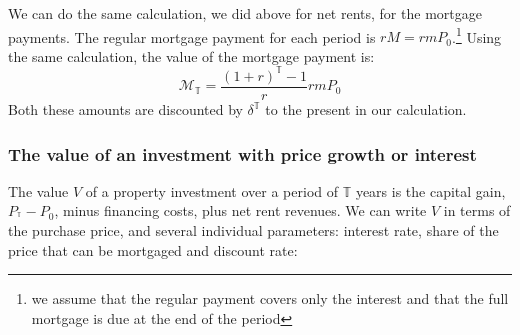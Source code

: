 {We can do the same calculation, we did above for net rents, for the mortgage payments.
The regular mortgage payment for each period is $rM=rmP_0$.\footnote{we assume that the regular payment covers only the interest and that the full mortgage is due at the end of the period } Using the same calculation, the value of the mortgage payment is: %
\begin{equation}
\mathcal{M}_{\mathbb{T}} = \frac{(1+r)^\mathbb{T}-1}{r}rmP_0  
\end{equation}
  Both these amounts are discounted by $\delta^\mathbb{T}$ to the present in our calculation.
 
\subsubsection{The value of an investment with price growth or interest}
 The value $V$ of a property investment over a period of $\mathbb{T}$ years is  the capital gain, $P_{^\mathbb{T}}-P_{0}$, minus financing costs, plus net rent revenues.
 We can write $V$ in terms of the purchase price, and several individual parameters: interest  rate, share of the price that can be mortgaged and  discount rate:%
 
}
